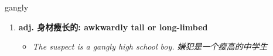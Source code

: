 
\begin{frame}
{\huge gangly}
\begin{center}
\begin{enumerate}\Large
  \item \textbf{adj. 身材瘦长的: awkwardly tall or long-limbed}
  \begin{itemize}
    \item \em{\Large{The suspect is a gangly high school boy. 嫌犯是一个瘦高的中学生}}
  \end{itemize}
\end{enumerate}
\end{center}
\end{frame}
